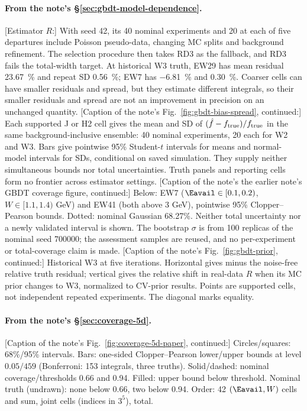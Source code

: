 \paragraph{From the note's \S\ref{sec:gbdt-model-dependence}.}
[Estimator $R$:] With seed 42, its 40 nominal experiments and 20 at each of five departures include Poisson pseudo-data, changing MC splits and background refinement.
The selection procedure then takes RD3 as the fallback, and RD3 fails the total-width target.
At historical W3 truth, EW29 has mean residual \SI{23.67}{\percent} and repeat SD \SI{0.56}{\percent}; EW7 has \SI{-6.81}{\percent} and \SI{0.30}{\percent}. Coarser cells can have smaller residuals and spread, but they estimate different integrals, so their smaller residuals and spread are not an improvement in precision on an unchanged quantity.
[Caption of the note's Fig.~\ref{fig:gbdt-bias-spread}, continued:] Each supported J or H2 cell gives the mean and SD of $(\hat f-f_{\rm true})/f_{\rm true}$ in the same background-inclusive ensemble: 40 nominal experiments, 20 each for W2 and W3. Bars give pointwise 95\% Student-$t$ intervals for means and normal-model intervals for SDs, conditional on saved simulation. They supply neither simultaneous bounds nor total uncertainties. Truth panels and reporting cells form no frontier across estimator settings.
[Caption of the note's the earlier note's GBDT coverage figure, continued:] Below: EW7 ($\Eavail\in[0.1,0.2)$, $W\in[1.1,1.4)$ GeV) and EW41 (both above 3 GeV), pointwise 95\% Clopper--Pearson bounds. Dotted: nominal Gaussian 68.27\%. Neither total uncertainty nor a newly validated interval is shown. The bootstrap $\sigma$ is from 100 replicas of the nominal seed 700000; the assessment samples are reused, and no per-experiment or total-coverage claim is made.
[Caption of the note's Fig.~\ref{fig:gbdt-prior}, continued:] Historical W3 at five iterations. Horizontal gives minus the noise-free relative truth residual; vertical gives the relative shift in real-data $R$ when its MC prior changes to W3, normalized to CV-prior results. Points are supported cells, not independent repeated experiments. The diagonal marks equality.

\paragraph{From the note's \S\ref{sec:coverage-5d}.}
[Caption of the note's Fig.~\ref{fig:coverage-5d-paper}, continued:] Circles/squares: 68\%/95\% intervals. Bars: one-sided Clopper--Pearson lower/upper bounds at level $0.05/459$ (Bonferroni: 153 integrals, three truths). Solid/dashed: nominal coverage/thresholds 0.66 and 0.94. Filled: upper bound below threshold. Nominal truth (undrawn): none below 0.66, two below 0.94. Order: 42 $(\Eavail,W)$ cells and sum, \jtNcells{} joint cells (indices in $3^5$), total.

